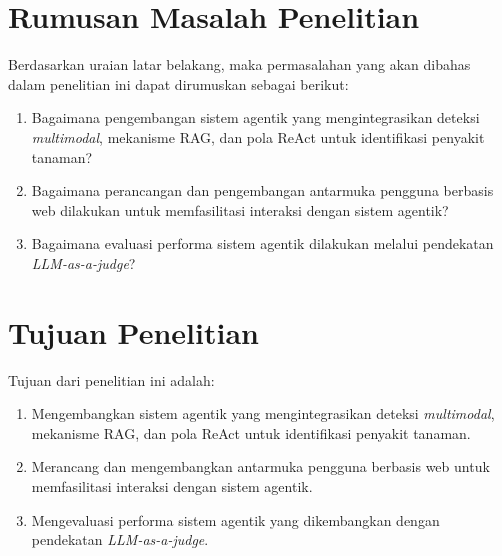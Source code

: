 \section{Rumusan Masalah Penelitian}
Berdasarkan uraian latar belakang, maka permasalahan yang akan dibahas dalam penelitian ini dapat dirumuskan sebagai berikut: 
\begin{enumerate}[nosep]
    \item Bagaimana pengembangan sistem agentik yang mengintegrasikan deteksi \textit{multimodal}, mekanisme RAG, dan pola ReAct untuk identifikasi penyakit tanaman?
    \item Bagaimana perancangan dan pengembangan antarmuka pengguna berbasis web dilakukan untuk memfasilitasi interaksi dengan sistem agentik?
    \item Bagaimana evaluasi performa sistem agentik dilakukan melalui pendekatan \textit{LLM-as-a-judge}?
\end{enumerate}

\section{Tujuan Penelitian}
Tujuan dari penelitian ini adalah: 
\begin{enumerate}[nosep]
    \item Mengembangkan sistem agentik yang mengintegrasikan deteksi \textit{multimodal}, mekanisme RAG, dan pola ReAct untuk identifikasi penyakit tanaman.
    \item Merancang dan mengembangkan antarmuka pengguna berbasis web untuk memfasilitasi interaksi dengan sistem agentik.
    \item Mengevaluasi performa sistem agentik yang dikembangkan dengan pendekatan \textit{LLM-as-a-judge}.
\end{enumerate}


